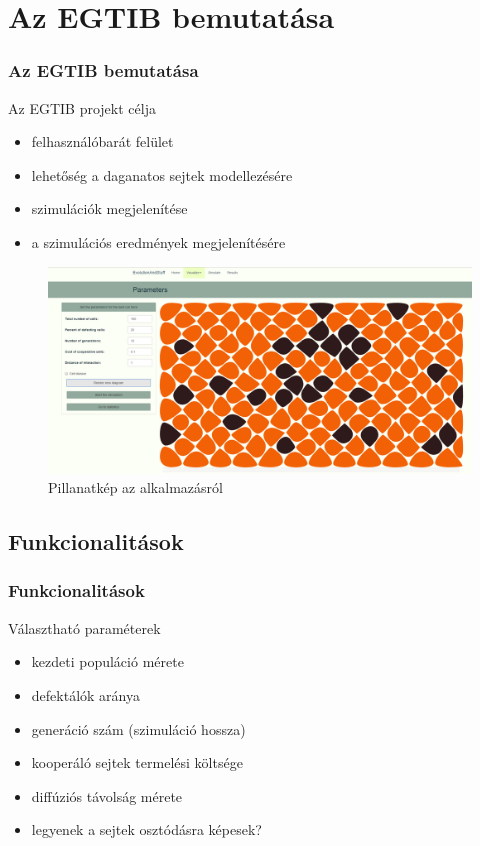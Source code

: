 \section{Az EGTIB bemutatása}
\begin{frame}
	\frametitle{Az EGTIB bemutatása}
	\begin{block}{Az EGTIB projekt célja}
		\begin{itemize}
			\item felhasználóbarát felület
			\item lehetőség a daganatos sejtek modellezésére 
			\item szimulációk megjelenítése
			\pause
			\item a szimulációs eredmények megjelenítésére
		\end{itemize}
	\end{block}

	\begin{figure}[ht!]
		\centering
		\includegraphics[width=0.6\linewidth]{images/voronoi_page.png}
		\caption{Pillanatkép az alkalmazásról}
		\label{fig:SimulateWithDiagram}
	\end{figure}
\end{frame}

\subsection{Funkcionalitások}
\begin{frame}
	\frametitle{Funkcionalitások}
	\begin{block}{Választható paraméterek}
		\begin{itemize}
			\item kezdeti populáció mérete
			\item defektálók aránya 
			\item generáció szám (szimuláció hossza)
			\item kooperáló sejtek termelési költsége 
			\item diffúziós távolság mérete
			\item legyenek a sejtek osztódásra képesek?
		\end{itemize}
	\end{block}
\end{frame}

